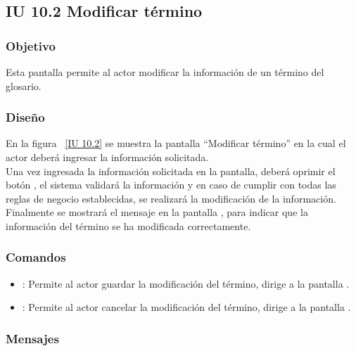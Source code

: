 \newpage 
\subsection{IU 10.2 Modificar término}

\subsubsection{Objetivo}
	
	Esta pantalla permite al actor modificar la información de un término del glosario.

\subsubsection{Diseño}

    En la figura ~\ref{IU 10.2} se muestra la pantalla ``Modificar término'' en la cual el actor deberá ingresar la información solicitada. \\
    
    Una vez ingresada la información solicitada en la pantalla, deberá oprimir el botón , el sistema validará la información y en caso de cumplir con todas las reglas de negocio establecidas, se realizará la modificación de la información.\\
    
    Finalmente se mostrará el mensaje  en la pantalla , para indicar que la información del término se ha modificada correctamente.        



\subsubsection{Comandos}
\begin{itemize}
	\item {}: Permite al actor guardar la modificación del término, dirige a la pantalla .
	\item {}: Permite al actor cancelar la modificación del término, dirige a la pantalla .
\end{itemize}

\subsubsection{Mensajes}
	

